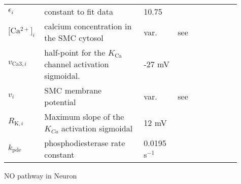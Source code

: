 \documentclass[fleqn]{report}
\numberwithin{equation}{section}
\numberwithin{equation}{section}
\newcommand{\LArg}{\text{L-Arg}}
\newcommand{\Otwo}{\text{O$_2$}}
\newcommand{\Cai}{\text{[Ca$^{2+}]_i$}}
\newcommand{\uMpers}{\textmu M\,s$^{-1}$}
\newcommand{\n}{$^{-1}$}
\begin{document}
\begin{table}[h!]
\begin{tabular}{ p{0.1\linewidth}  >{\footnotesize} p{0.41\linewidth}  >{\footnotesize} p{0.14\linewidth} >{\footnotesize} p{0.26\linewidth} }
									$ \epsilon_i$			& constant to fit data 				& 10.75 \uM 	&  \citep{Stockand1996} \\ 
									$ \Cai $ 				& calcium concentration in the SMC cytosol & var. 		& see \citet{Dormanns2014} \\
									$ v_{\text{Ca}3,i} $ 			& half-point for the $ K_{\text{Ca}} $ channel activation sigmoidal. & -27 mV & \citep{Koenigsberger2006}\\ 
									$ v_i $ 				& SMC membrane potential 		& var. 	& see \citep{Dormanns2014} \\
									$ R_{\text{K},i}  $ 				& Maximum slope of the $K_{Ca}$ activation sigmoidal & 12 mV & \citep{Koenigsberger2006}\\ 
									$ k_{\text{pde}} $		& phosphodiesterase rate constant & 0.0195 s\n & \citep{Yang2005} \\
									\hline
								\end{tabular}
							\end{table}	
     NO pathway in Neuron 
\end{document}
